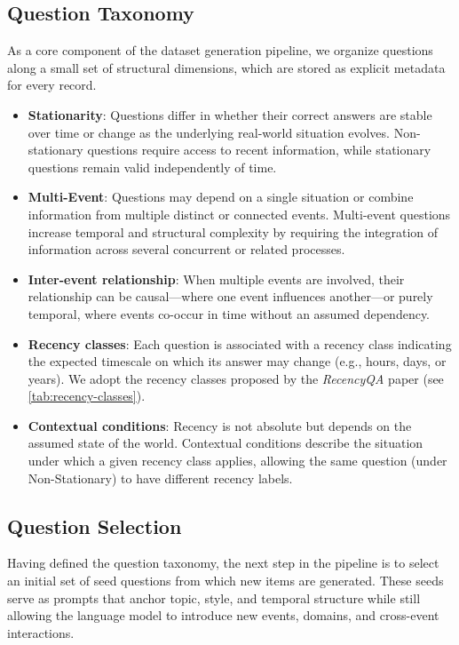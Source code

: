 \subsection{Question Taxonomy}
As a core component of the dataset generation pipeline, we organize questions along a small set of structural dimensions, which are stored as explicit metadata for every record.
\begin{itemize}
    \item \textbf{Stationarity}: Questions differ in whether their correct answers are stable over time or change as the underlying real-world situation evolves. Non-stationary questions require access to recent information, while stationary questions remain valid independently of time.
    \item \textbf{Multi-Event}: Questions may depend on a single situation or combine information from multiple distinct or connected events. Multi-event questions increase temporal and structural complexity by requiring the integration of information across several concurrent or related processes.
    \item \textbf{Inter-event relationship}: When multiple events are involved, their relationship can be causal—where one event influences another—or purely temporal, where events co-occur in time without an assumed dependency.
    \item \textbf{Recency classes}: Each question is associated with a recency class indicating the expected timescale on which its answer may change (e.g., hours, days, or years). We adopt the recency classes proposed by the \textit{RecencyQA} paper (see \autoref{tab:recency-classes}).
    \item \textbf{Contextual conditions}: Recency is not absolute but depends on the assumed state of the world. Contextual conditions describe the situation under which a given recency class applies, allowing the same question (under Non-Stationary) to have different recency labels.
\end{itemize}

\subsection{Question Selection}
Having defined the question taxonomy, the next step in the pipeline is to select an initial set of seed questions from which new items are generated. These seeds serve as prompts that anchor topic, style, and temporal structure while still allowing the language model to introduce new events, domains, and cross-event interactions.

